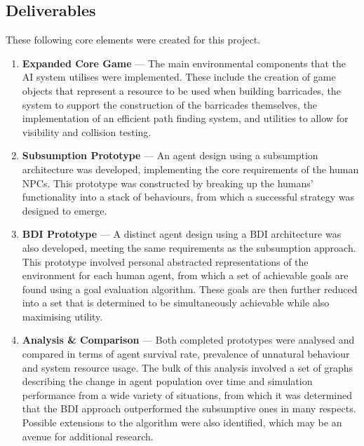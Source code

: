 \documentclass[a4paper,12pt]{article}
\newcommand{\deliverable}[2]{\item \textbf{#1} --- #2}
\begin{document}
\subsection{Deliverables}\noindent
These following core elements were created for this project.

\begin{enumerate}
  \deliverable{Expanded Core Game}
  {The main environmental components that the AI system utilises were implemented. These include the creation of game objects that represent a resource to be used when building barricades, the system to support the construction of the barricades themselves, the implementation of an efficient path finding system, and utilities to allow for visibility and collision testing.}

  \deliverable{Subsumption Prototype}
  {An agent design using a subsumption architecture was developed, implementing the core requirements of the human NPCs. This prototype was constructed by breaking up the humans' functionality into a stack of behaviours, from which a successful strategy was designed to emerge.}

  \deliverable{BDI Prototype}
  {A distinct agent design using a BDI architecture was also developed, meeting the same requirements as the subsumption approach. This prototype involved personal abstracted representations of the environment for each human agent, from which a set of achievable goals are found using a goal evaluation algorithm. These goals are then further reduced into a set that is determined to be simultaneously achievable while also maximising utility.}

  \deliverable{Analysis \& Comparison}
  {Both completed prototypes were analysed and compared in terms of agent survival rate, prevalence of unnatural behaviour and system resource usage. The bulk of this analysis involved a set of graphs describing the change in agent population over time and simulation performance from a wide variety of situations, from which it was determined that the BDI approach outperformed the subsumptive ones in many respects. Possible extensions to the algorithm were also identified, which may be an avenue for additional research.}
\end{enumerate}
\end{document}
